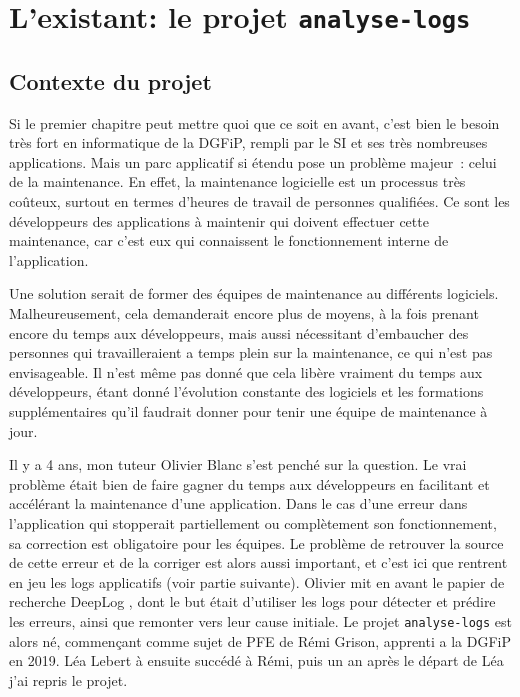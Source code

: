 \documentclass[openany, 12pt]{memoir}
\begin{document}

\newpage
\chapter{L'existant: le projet \texttt{analyse-logs}}

\section{Contexte du projet}

Si le premier chapitre peut mettre quoi que ce soit en avant, c'est bien le besoin très fort en informatique de la \gls{DGFiP}, rempli par le \gls{SI} et ses très nombreuses applications. Mais un parc applicatif si étendu pose un problème majeur~: celui de la maintenance. En effet, la maintenance logicielle est un processus très coûteux, surtout en termes d'heures de travail de personnes qualifiées. Ce sont les développeurs des applications à maintenir qui doivent effectuer cette maintenance, car c'est eux qui connaissent le fonctionnement interne de l'application.

Une solution serait de former des équipes de maintenance au différents logiciels. Malheureusement, cela demanderait encore plus de moyens, à la fois prenant encore du temps aux développeurs, mais aussi nécessitant d'embaucher des personnes qui travailleraient a temps plein sur la maintenance, ce qui n'est pas envisageable. Il n'est même pas donné que cela libère vraiment du temps aux développeurs, étant donné l'évolution constante des logiciels et les formations supplémentaires qu'il faudrait donner pour tenir une équipe de maintenance à jour.

\bigskip
Il y a 4 ans, mon tuteur Olivier Blanc s'est penché sur la question. Le vrai problème était bien de faire gagner du temps aux développeurs en facilitant et accélérant la maintenance d'une application. Dans le cas d'une erreur dans l'application qui stopperait partiellement ou complètement son fonctionnement, sa correction est obligatoire pour les équipes. Le problème de retrouver la source de cette erreur et de la corriger est alors aussi important, et c'est ici que rentrent en jeu les \glspl{log} applicatifs (voir partie suivante). Olivier mit en avant le papier de recherche DeepLog \cite{deeplog}, dont le but était d'utiliser les logs pour détecter et prédire les erreurs, ainsi que remonter vers leur cause initiale. Le projet \texttt{analyse-logs} est alors né, commençant comme sujet de PFE de Rémi Grison, apprenti a la DGFiP en 2019. Léa Lebert à ensuite succédé à Rémi, puis un an après le départ de Léa j'ai repris le projet.
\end{document}
